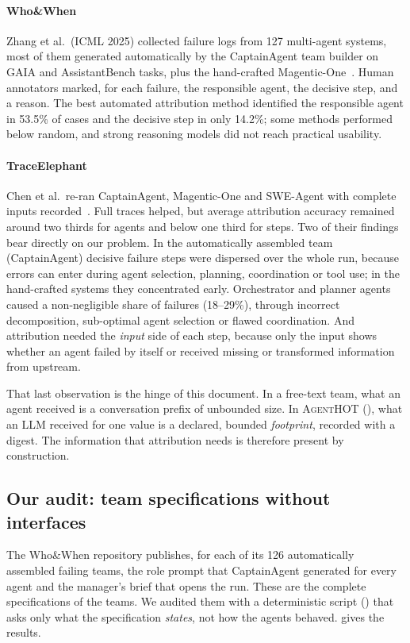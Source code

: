 \documentclass[10pt,a4paper]{article}
\newcommand{\tool}{\textsc{AgentHOT}}
\begin{document}
\paragraph{Who\&When} Zhang et al.\ (ICML 2025) collected failure logs from
127 multi-agent systems, most of them generated automatically by the
CaptainAgent team builder on GAIA and AssistantBench tasks, plus the
hand-crafted Magentic-One~\cite{zhang2025whowhen}. Human annotators marked,
for each failure, the responsible agent, the decisive step, and a reason.
The best automated attribution method identified the responsible agent in
53.5\% of cases and the decisive step in only 14.2\%; some methods
performed below random, and strong reasoning models did not reach
practical usability.

\paragraph{TraceElephant} Chen et al.\ re-ran CaptainAgent, Magentic-One and
SWE-Agent with complete inputs recorded~\cite{chen2026traceelephant}.
Full traces helped, but average attribution accuracy remained around
two thirds for agents and below one third for steps. Two of their findings
bear directly on our problem. In the automatically assembled team
(CaptainAgent) decisive failure steps were dispersed over the whole run,
because errors can enter during agent selection, planning, coordination or
tool use; in the hand-crafted systems they concentrated early.
Orchestrator and planner agents caused a non-negligible share of failures
(18--29\%), through incorrect decomposition, sub-optimal agent selection
or flawed coordination. And attribution needed the \emph{input} side of
each step, because only the input shows whether an agent failed by itself
or received missing or transformed information from upstream.

That last observation is the hinge of this document. In a free-text team,
what an agent received is a conversation prefix of unbounded size. In
\tool{} (), what an LLM received for one value is a
declared, bounded \emph{footprint}, recorded with a digest. The information
that attribution needs is therefore present by construction.

\subsection{Our audit: team specifications without interfaces}\label{sec:audit}

The Who\&When repository publishes, for each of its 126 automatically
assembled failing teams, the role prompt that CaptainAgent generated for
every agent and the manager's brief that opens the run. These are the
complete specifications of the teams. We audited them with a deterministic
script () that asks only what the specification
\emph{states}, not how the agents behaved.  gives the
results.
\end{document}
